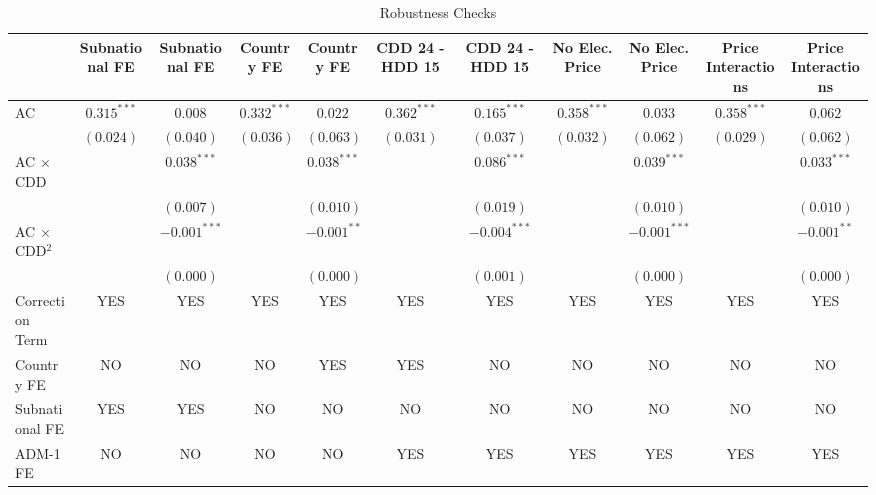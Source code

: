 
\begin{table}[H]
\caption{Robustness Checks}
\begin{center}
\begin{tabular}{l c c c c c c c c c c}
\hline
 & Subnational FE & Subnational FE & Country FE & Country FE & CDD 24 - HDD 15 & CDD 24 - HDD 15 & No Elec. Price & No Elec. Price & Price Interactions & Price Interactions \\
\hline
AC                      & $0.315^{***}$ & $0.008$        & $0.332^{***}$ & $0.022$       & $0.362^{***}$ & $0.165^{***}$  & $0.358^{***}$ & $0.033$        & $0.358^{***}$ & $0.062$       \\
                        & $(0.024)$     & $(0.040)$      & $(0.036)$     & $(0.063)$     & $(0.031)$     & $(0.037)$      & $(0.032)$     & $(0.062)$      & $(0.029)$     & $(0.062)$     \\
AC $\times$ CDD         &               & $0.038^{***}$  &               & $0.038^{***}$ &               & $0.086^{***}$  &               & $0.039^{***}$  &               & $0.033^{***}$ \\
                        &               & $(0.007)$      &               & $(0.010)$     &               & $(0.019)$      &               & $(0.010)$      &               & $(0.010)$     \\
AC $\times$ CDD$^2$     &               & $-0.001^{***}$ &               & $-0.001^{**}$ &               & $-0.004^{***}$ &               & $-0.001^{***}$ &               & $-0.001^{**}$ \\
                        &               & $(0.000)$      &               & $(0.000)$     &               & $(0.001)$      &               & $(0.000)$      &               & $(0.000)$     \\
\hline
Correction Term         & YES           & YES            & YES           & YES           & YES           & YES            & YES           & YES            & YES           & YES           \\
Country FE              & NO            & NO             & NO            & YES           & YES           & NO             & NO            & NO             & NO            & NO            \\
Subnational FE          & YES           & YES            & NO            & NO            & NO            & NO             & NO            & NO             & NO            & NO            \\
ADM-1 FE                & NO            & NO             & NO            & NO            & YES           & YES            & YES           & YES            & YES           & YES           \\

\end{tabular}
\end{center}
\end{table}
